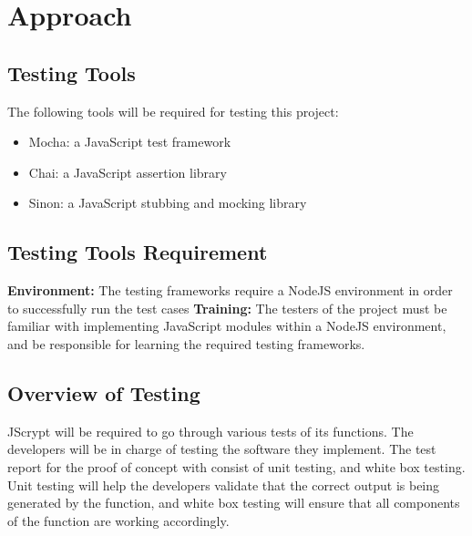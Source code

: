 \documentclass[12pt]{article}
\begin{document}
\section{Approach}
\subsection{Testing Tools}
The following tools will be required for testing this project:
  \begin{itemize}
    \item Mocha: a JavaScript test framework
    \item Chai: a JavaScript assertion library
    \item Sinon: a JavaScript stubbing and mocking library
  \end{itemize}

\subsection{Testing Tools Requirement}
\textbf{Environment:} The testing frameworks require a NodeJS environment in order to successfully run the test cases \newline
\textbf{Training:} The testers of the project must be familiar with implementing JavaScript modules within a NodeJS environment, and be responsible for learning the required testing frameworks.

\subsection{Overview of Testing}
JScrypt will be required to go through various tests of its functions. The developers will be in charge of testing the software they implement. The test report for the proof of concept with consist of unit testing, and white box testing. Unit testing will help the developers validate that the correct output is being generated by the function, and white box testing will ensure that all components of the function are working accordingly.
\end{document}
